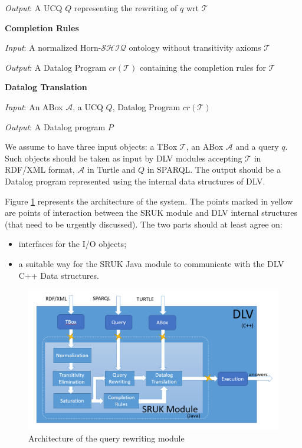 \documentclass[oneside]{book}
\newcommand{\shiq}{$\mathcal{SHIQ}$\xspace}
\newcommand{\hshiq}{Horn-\shiq\xspace}
\newcommand{\T}{\mathcal{T}}
\newcommand{\A}{\mathcal{A}}
\begin{document}
\textit{Output}: A UCQ $Q$ representing the rewriting of $q$ wrt $\T$

\noindent\textbf{Completion Rules}

\textit{Input}: A normalized \hshiq ontology without transitivity axioms $\T$

\textit{Output}: A Datalog Program $cr(\T)$ containing the completion rules for $\T$

\noindent\textbf{Datalog Translation}

\textit{Input}: An ABox  $\A$, a UCQ $Q$, Datalog Program $cr(\T)$

\textit{Output}: A Datalog program $P$


We assume to have three input objects: a TBox $\T$, an ABox $\A$ and a query $q$. Such objects should be taken as input by DLV modules accepting $\T$ in RDF/XML format, $\A$ in Turtle and $Q$ in SPARQL.
The output should be a Datalog program represented using the internal data structures of DLV.

Figure \ref{fig:architecture} represents the architecture of the system. The points marked in yellow are points of interaction between the SRUK module and DLV internal structures (that need to be urgently discussed).
%
The two parts should at least agree on:
\begin{itemize}
	\item interfaces for the I/O objects;
	\item a suitable way for the SRUK Java module to communicate with the DLV C++ Data structures. 
\end{itemize}


\begin{figure}
	\centering
	\includegraphics[width=1\linewidth]{Architecture}
	\caption{Architecture of the query rewriting module}
	\label{fig:architecture}
\end{figure}
\end{document}
